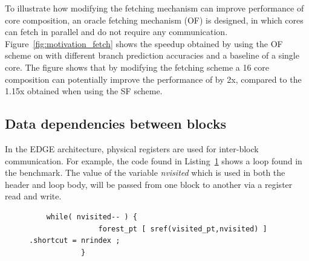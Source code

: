 To illustrate how modifying the fetching mechanism can improve performance of core composition, an oracle fetching mechanism (OF) is designed, in which cores can fetch in parallel and do not require any communication.
Figure~\ref{fig:motivation_fetch} shows the speedup obtained by using the OF scheme on  with different branch prediction accuracies and a baseline of a single core.
The figure shows that by modifying the fetching scheme a 16 core composition can potentially improve the performance of  by 2x, compared to the 1.15x obtained when using the SF scheme.

\subsection{Data dependencies between blocks}

In the EDGE architecture, physical registers are used for inter-block communication.
For example, the code found in Listing~\ref{lst:mser_snipet} shows a loop found in the  benchmark.
The value of the variable \textit{nvisited} which is used in both the header and loop body, will be passed from one block to another via a register read and write.


\begin{figure}[t]
\lstset{language=C,numbersep=4pt}
\begin{center}
\begin{lstlisting}
	while( nvisited-- ) {
				forest_pt [ sref(visited_pt,nvisited) ] .shortcut = nrindex ;
			}
\end{lstlisting}
\end{center}
\vspace{-1em}
\label{lst:mser_snipet}
\vspace{1em}
\end{figure}

